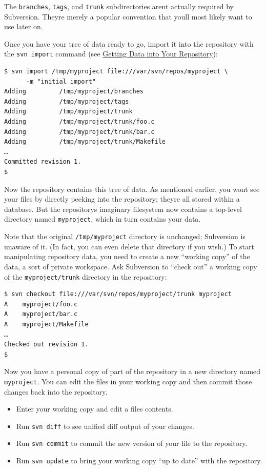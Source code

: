 The \texttt{branches}, \texttt{tags}, and \texttt{trunk} subdirectories
aren\textquotesingle t actually required by Subversion.
They\textquotesingle re merely a popular convention that
you\textquotesingle ll most likely want to use later on.

Once you have your tree of data ready to go, import it into the
repository with the \texttt{svn\ import} command (see
\hyperref[svn.tour.importing]{Getting Data into Your Repository}):

\begin{verbatim}
$ svn import /tmp/myproject file:///var/svn/repos/myproject \
      -m "initial import"
Adding         /tmp/myproject/branches
Adding         /tmp/myproject/tags
Adding         /tmp/myproject/trunk
Adding         /tmp/myproject/trunk/foo.c
Adding         /tmp/myproject/trunk/bar.c
Adding         /tmp/myproject/trunk/Makefile
…
Committed revision 1.
$ 
\end{verbatim}

Now the repository contains this tree of data. As mentioned earlier, you
won\textquotesingle t see your files by directly peeking into the
repository; they\textquotesingle re all stored within a database. But
the repository\textquotesingle s imaginary filesystem now contains a
top-level directory named \texttt{myproject}, which in turn contains
your data.

Note that the original \texttt{/tmp/myproject} directory is unchanged;
Subversion is unaware of it. (In fact, you can even delete that
directory if you wish.) To start manipulating repository data, you need
to create a new ``working copy'' of the data, a sort of private
workspace. Ask Subversion to ``check out'' a working copy of the
\texttt{myproject/trunk} directory in the repository:

\begin{verbatim}
$ svn checkout file:///var/svn/repos/myproject/trunk myproject
A    myproject/foo.c
A    myproject/bar.c
A    myproject/Makefile
…
Checked out revision 1.
$
\end{verbatim}

Now you have a personal copy of part of the repository in a new
directory named \texttt{myproject}. You can edit the files in your
working copy and then commit those changes back into the repository.

\begin{itemize}
\item
  Enter your working copy and edit a file\textquotesingle s contents.
\item
  Run \texttt{svn\ diff} to see unified diff output of your changes.
\item
  Run \texttt{svn\ commit} to commit the new version of your file to the
  repository.
\item
  Run \texttt{svn\ update} to bring your working copy ``up to date''
  with the repository.
\end{itemize}

